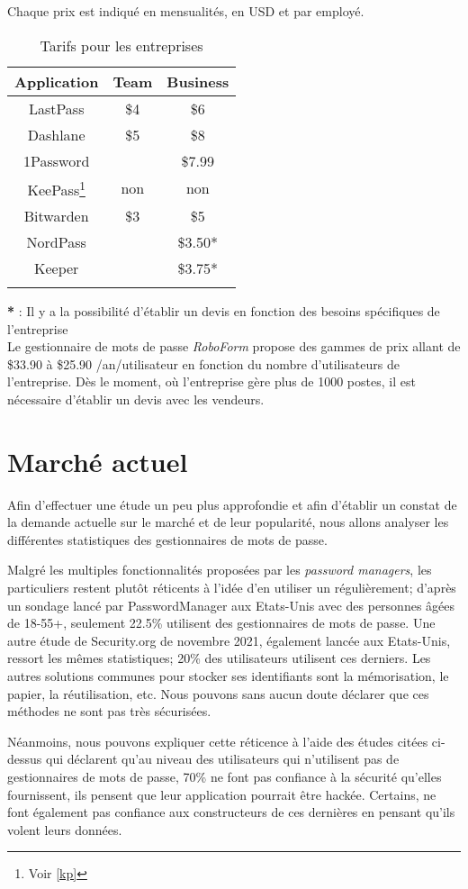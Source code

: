 Chaque prix est indiqué en mensualités, en USD et par employé.
\begin{longtable}[h]{|c|c|c|}
	\hline
	Application & Team & Business \\
	\hline
	LastPass & \$4 & \$6  \\
	\hline
	Dashlane & \$5 & \$8 \\
	\hline
	1Password &  & \$7.99  \\
	\hline
	KeePass\footnote{Voir \ref{kp}} & non & non \\
	\hline
	Bitwarden & \$3 & \$5  \\
	\hline
	NordPass &  & \$3.50* \\
	\hline
	Keeper & & \$3.75* \\
	\hline
	\caption{Tarifs pour les entreprises}
\end{longtable}
\textbf{*}\hspace{0.1cm} :  Il y a la possibilité d'établir un devis en fonction des besoins spécifiques de l'entreprise \\

Le gestionnaire de mots de passe \textit{RoboForm} propose des gammes de prix allant de \$33.90 à \$25.90 /an/utilisateur en fonction du nombre d'utilisateurs de l'entreprise. Dès le moment, où l'entreprise gère plus de 1000 postes, il est nécessaire d'établir un devis avec les vendeurs.
\section{Marché actuel}
Afin d'effectuer une étude un peu plus approfondie et afin d'établir un constat de la demande actuelle sur le marché et de leur popularité, nous allons analyser les différentes statistiques des gestionnaires de mots de passe. 

Malgré les multiples fonctionnalités proposées par les \textit{password managers}, les particuliers restent plutôt réticents à l'idée d'en utiliser un régulièrement; d'après un sondage lancé par PasswordManager\cite{PMC} aux Etats-Unis avec des personnes âgées de 18-55+, seulement 22.5\% utilisent des gestionnaires de mots de passe. Une autre étude de Security.org\cite{PM21} de novembre 2021, également lancée aux Etats-Unis, ressort les mêmes statistiques; 20\% des utilisateurs utilisent ces derniers. Les autres solutions communes pour stocker ses identifiants sont la mémorisation, le papier, la réutilisation, etc. Nous pouvons sans aucun doute déclarer que ces méthodes ne sont pas très sécurisées. 

Néanmoins, nous pouvons expliquer cette réticence à l'aide des études citées ci-dessus qui déclarent qu'au niveau des utilisateurs qui n'utilisent pas de gestionnaires de mots de passe, 70\% ne font pas confiance à la sécurité qu'elles fournissent, ils pensent que leur application pourrait être hackée. Certains, ne font également pas confiance aux constructeurs de ces dernières en pensant qu'ils volent leurs données.

